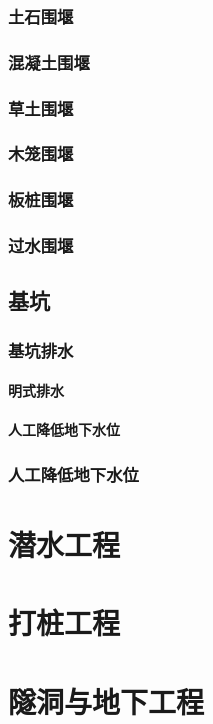 \documentclass[UTF8]{../../ApplicationUniverse}
\begin{document}
        \subsubsection{土石围堰}
        \subsubsection{混凝土围堰}
        \subsubsection{草土围堰}
        \subsubsection{木笼围堰}
        \subsubsection{板桩围堰}
        \subsubsection{过水围堰}
    \subsection{基坑}
        \subsubsection{基坑排水}
            \paragraph{明式排水}
            \paragraph{人工降低地下水位}
        \subsubsection{人工降低地下水位}
\section{潜水工程}
\section{打桩工程}
\section{隧洞与地下工程}
\end{document}
